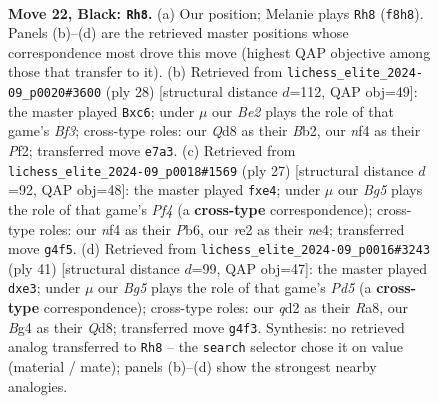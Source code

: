 \documentclass[11pt]{article}
\begin{document}
\begin{figure}[p]
\label{fig:thought-m41}
\end{figure}

\clearpage

\begin{figure}[p]\centering
\begin{subfigure}{0.46\textwidth}\centering
\resizebox{\linewidth}{!}{%
\newchessgame
\chessboard[
  setfen={r2q1r2/ppp1b1k1/n4pp1/3P3p/P1p2Nb1/2N5/RPPQRPPP/2B3K1 b - - 2 22},
  showmover=false,
  pgfstyle=straightmove, color=movearrow, markmove={f8-h8}
]}
\caption{}
\end{subfigure}\hfill
\begin{subfigure}{0.46\textwidth}\centering
\resizebox{\linewidth}{!}{%
\newchessgame
\chessboard[
  setfen={r4rk1/pp2bppp/2nqpn2/8/2Pp4/1P3BN1/PB3PPP/R2Q1RK1 w - - 0 15},
  showmover=false,
  pgfstyle=straightmove, color=movearrow, markmove={f3-c6}
]}
\caption{}
\end{subfigure}
\\[4pt]
\begin{subfigure}{0.46\textwidth}\centering
\resizebox{\linewidth}{!}{%
\newchessgame
\chessboard[
  setfen={r2q1rk1/pbp1bp1p/1p2p3/5p2/3PN3/5NP1/PPP1QPBP/2KR2R1 b - - 0 14},
  showmover=false,
  pgfstyle=straightmove, color=movearrow, markmove={f5-e4}
]}
\caption{}
\end{subfigure}\hfill
\begin{subfigure}{0.46\textwidth}\centering
\resizebox{\linewidth}{!}{%
\newchessgame
\chessboard[
  setfen={r2qr1k1/1b1N1pb1/1p4pp/p7/2PpP3/1P2N2P/P1Q2PP1/3RRBK1 b - - 0 21},
  showmover=false,
  pgfstyle=straightmove, color=movearrow, markmove={d4-e3}
]}
\caption{}
\end{subfigure}
\caption{\textbf{Move 22, Black: \texttt{Rh8}.} (a) Our position; Melanie plays \texttt{Rh8} (\texttt{f8h8}). Panels (b)--(d) are the retrieved master positions whose correspondence most drove this move (highest QAP objective among those that transfer to it). (b) Retrieved from \texttt{lichess\_elite\_2024-09\_p0020\#3600} (ply 28) [structural distance $d$=112, QAP obj=49]: the master played \texttt{Bxc6}; under $\mu$ our \emph{Be2} plays the role of that game's \emph{Bf3}; cross-type roles: our \emph{Q}d8 as their \emph{B}b2, our \emph{n}f4 as their \emph{P}f2; transferred move \texttt{e7a3}. (c) Retrieved from \texttt{lichess\_elite\_2024-09\_p0018\#1569} (ply 27) [structural distance $d$=92, QAP obj=48]: the master played \texttt{fxe4}; under $\mu$ our \emph{Bg5} plays the role of that game's \emph{Pf4} (a \textbf{cross-type} correspondence); cross-type roles: our \emph{n}f4 as their \emph{P}b6, our \emph{r}e2 as their \emph{n}e4; transferred move \texttt{g4f5}. (d) Retrieved from \texttt{lichess\_elite\_2024-09\_p0016\#3243} (ply 41) [structural distance $d$=99, QAP obj=47]: the master played \texttt{dxe3}; under $\mu$ our \emph{Bg5} plays the role of that game's \emph{Pd5} (a \textbf{cross-type} correspondence); cross-type roles: our \emph{q}d2 as their \emph{R}a8, our \emph{B}g4 as their \emph{Q}d8; transferred move \texttt{g4f3}. Synthesis: no retrieved analog transferred to \texttt{Rh8} -- the \texttt{search} selector chose it on value (material / mate); panels (b)--(d) show the strongest nearby analogies.}

\end{figure}
\end{document}
